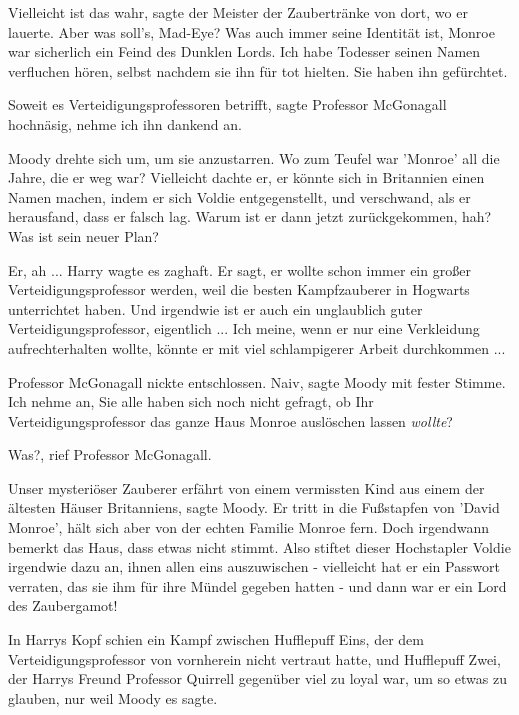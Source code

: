 \glqq{}Vielleicht ist das wahr\grqq{}, sagte der Meister der Zaubertränke von
dort, wo er lauerte. \glqq{}Aber was soll's, Mad-Eye? Was auch immer seine
Identität ist, Monroe war sicherlich ein Feind des Dunklen Lords. Ich habe
Todesser seinen Namen verfluchen hören, selbst nachdem sie ihn für tot hielten.
Sie haben ihn gefürchtet.\grqq{}

\glqq{}Soweit es Verteidigungsprofessoren betrifft\grqq{}, sagte Professor
McGonagall hochnäsig, \glqq{}nehme ich ihn dankend an.\grqq{}

Moody drehte sich um, um sie anzustarren. \glqq{}Wo zum Teufel war 'Monroe' all
die Jahre, die er weg war? Vielleicht dachte er, er könnte sich in Britannien
einen Namen machen, indem er sich Voldie entgegenstellt, und verschwand, als er
herausfand, dass er falsch lag. Warum ist er dann jetzt zurückgekommen, hah? Was
ist sein neuer Plan?\grqq{}

\glqq{}Er, ah ...\grqq{} Harry wagte es zaghaft. \glqq{}Er sagt, er wollte schon
immer ein großer Verteidigungsprofessor werden, weil die besten Kampfzauberer in
Hogwarts unterrichtet haben. Und irgendwie ist er auch ein unglaublich guter
Verteidigungsprofessor, eigentlich ... Ich meine, wenn er nur eine Verkleidung
aufrechterhalten wollte, könnte er mit viel schlampigerer Arbeit
durchkommen ...\grqq{}

Professor McGonagall nickte entschlossen. \glqq{}Naiv\grqq{}, sagte Moody mit
fester Stimme. \glqq{}Ich nehme an, Sie alle haben sich noch nicht gefragt, ob
Ihr Verteidigungsprofessor das ganze Haus Monroe auslöschen lassen
\emph{wollte}?\grqq{}

\glqq{}Was?\grqq{}, rief Professor McGonagall.

\glqq{}Unser mysteriöser Zauberer erfährt von einem vermissten Kind aus einem der
ältesten Häuser Britanniens\grqq{}, sagte Moody. \glqq{}Er tritt in die
Fußstapfen von 'David Monroe', hält sich aber von der echten Familie Monroe
fern. Doch irgendwann bemerkt das Haus, dass etwas nicht stimmt. Also stiftet
dieser Hochstapler Voldie irgendwie dazu an, ihnen allen eins auszuwischen -
vielleicht hat er ein Passwort verraten, das sie ihm für ihre Mündel gegeben
hatten - und dann war er ein Lord des Zaubergamot!\grqq{}

In Harrys Kopf schien ein Kampf zwischen Hufflepuff Eins, der dem
Verteidigungsprofessor von vornherein nicht vertraut hatte, und Hufflepuff Zwei,
der Harrys Freund Professor Quirrell gegenüber viel zu loyal war, um so etwas zu
glauben, nur weil Moody es sagte.

